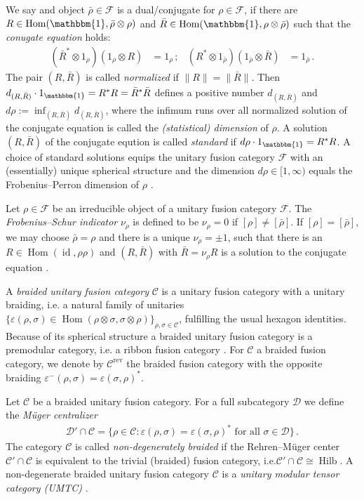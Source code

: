 \documentclass[twoside,11pt,reqno]{amsart}
\makeatletter
\theoremstyle{definition}
\theoremstyle{remark}
\newcommand{\cF}{\mathcal{F}}
\newcommand{\cD}{\mathcal{D}}
\newcommand{\cC}{\mathcal{C}}
\DeclareMathOperator{\Hom}{Hom}
\DeclareMathOperator{\id}{id}
\DeclareRobustCommand{\ie}{i.e.\@\xspace}
\DeclareMathOperator{\Vect}{Hilb}
\newcommand{\tu}{\mathbbm{1}} %
\newcommand{\rev}[1]{{#1}^\mathrm{rev}}
\newcommand{\myemph}[1]{\emph{#1}}
\makeatother
\begin{document}
We say and object $\bar\rho\in\cF$ is a dual/conjugate for $\rho\in\cF$,
if there are $R\in\Hom(\tu,\bar\rho\otimes \rho)$ and 
$\bar R\in\Hom(\tu,\rho\otimes\bar\rho)$ such that
the \myemph{conugate equation} holds:
\begin{align}
  (\bar R^\ast \otimes 1_\rho)(1_\rho\otimes R)
    &=1_\rho\,; &
  ( R^\ast \otimes 1_{\bar\rho})(1_{\bar\rho}\otimes \bar R)
    &=1_{\bar\rho}\,.
\end{align}
The pair $(R,\bar R)$ is called \myemph{normalized} if $\|R\|=\|\bar R\|$.
Then $d_{(R,\bar R)}\cdot 1_{\tu}=R^\ast R=\bar R^\ast \bar R$ 
defines a positive number $d_{(R,\bar R)}$
and $d\rho:=\inf_{(R,\bar R)} d_{(R,\bar R)}$, where the 
infimum runs over all normalized solution of the conjugate equation is called the 
\myemph{(statistical) dimension} of $\rho$.
A solution $(R,\bar R)$ of the conjugate eqution is called \myemph{standard}
if $d\rho\cdot 1_\tu=R^\ast R$.
A choice of standard solutions equips the unitary fusion category $\cF$ 
with an (essentially) unique spherical structure and the 
dimension $d\rho \in [1,\infty)$ equals the
Frobenius--Perron dimension of $\rho$
\cite{LoRo1997}. 


Let $\rho\in \cF$ be an irreducible object of a unitary fusion category $\cF$. 
The \myemph{Frobenius--Schur indicator} $\nu_\rho$ is defined to be 
$\nu_\rho=0$ if $[\rho]\neq[\bar\rho]$.
If $[\rho]=[\bar\rho]$, we may choose $\bar\rho=\rho$ and there is a unique 
$\nu_\rho=\pm1$, such that there is an $R\in\Hom(\id,\rho\rho)$ and $(R,\bar R)$
with $\bar R =\nu_\rho R$ is a solution to the conjugate equation 
\cite{LoRo1997}.

A \myemph{braided unitary fusion category} $\cC$ is a unitary fusion category
with a unitary braiding, \ie a natural family of unitaries 
$\{\varepsilon(\rho,\sigma)\in\Hom(\rho\otimes\sigma,\sigma\otimes\rho)
  \}_{\rho,\sigma\in \cC}$, fulfilling the usual hexagon identities.
Because of its spherical structure a braided unitary fusion category is a 
premodular category, \ie a ribbon fusion category \cite{Mg2003-MC}.
For $\cC$ a braided fusion category, we denote by $\rev{\cC}$ the 
braided fusion category with the opposite braiding 
$\varepsilon^-(\rho,\sigma)= \varepsilon(\sigma,\rho)^\ast$.

Let $\cC$ be a braided unitary fusion category. 
For a full subcategory $\cD$ we define the \myemph{M\"uger centralizer}
\begin{align}
  \cD'\cap \cC=\{\rho\in \cC: \varepsilon(\rho,\sigma)
    =\varepsilon(\sigma,\rho)^\ast \text{ for all }\sigma\in \cD\}\,.
\end{align}
The category $\cC$ is called \myemph{non-degenerately braided} if the 
Rehren--M\"uger center $\cC'\cap \cC$ is equivalent to the trivial
(braided) fusion category, %
\ie $\cC'\cap \cC\cong \Vect$.
A non-degenerate braided unitary fusion category $\cC$ is a 
\myemph{unitary modular tensor category (UMTC)} \cite{Re1989,Mg2003-MC}.
\end{document}
